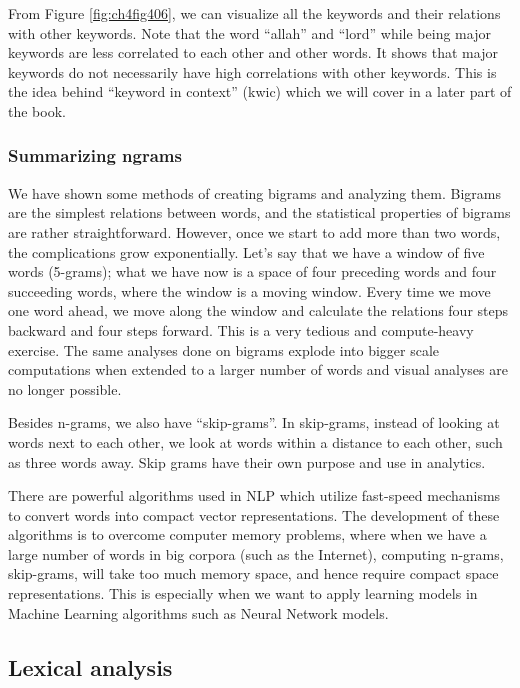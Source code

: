 \documentclass[
]{article}
\begin{document}
From Figure \ref{fig:ch4fig406}, we can visualize all the keywords and their relations with other keywords. Note that the word ``allah'' and ``lord'' while being major keywords are less correlated to each other and other words. It shows that major keywords do not necessarily have high correlations with other keywords. This is the idea behind ``keyword in context'' (kwic) which we will cover in a later part of the book.

\hypertarget{summarizing-ngrams}{%
\subsubsection{Summarizing ngrams}\label{summarizing-ngrams}}

We have shown some methods of creating bigrams and analyzing them. Bigrams are the simplest relations between words, and the statistical properties of bigrams are rather straightforward. However, once we start to add more than two words, the complications grow exponentially. Let's say that we have a window of five words (5-grams); what we have now is a space of four preceding words and four succeeding words, where the window is a moving window. Every time we move one word ahead, we move along the window and calculate the relations four steps backward and four steps forward. This is a very tedious and compute-heavy exercise. The same analyses done on bigrams explode into bigger scale computations when extended to a larger number of words and visual analyses are no longer possible.

Besides n-grams, we also have ``skip-grams''. In skip-grams, instead of looking at words next to each other, we look at words within a distance to each other, such as three words away. Skip grams have their own purpose and use in analytics.

There are powerful algorithms used in NLP which utilize fast-speed mechanisms to convert words into compact vector representations. The development of these algorithms is to overcome computer memory problems, where when we have a large number of words in big corpora (such as the Internet), computing n-grams, skip-grams, will take too much memory space, and hence require compact space representations. This is especially when we want to apply learning models in Machine Learning algorithms such as Neural Network models.

\hypertarget{lexical-analysis}{%
\subsection{Lexical analysis}\label{lexical-analysis}}
\end{document}
